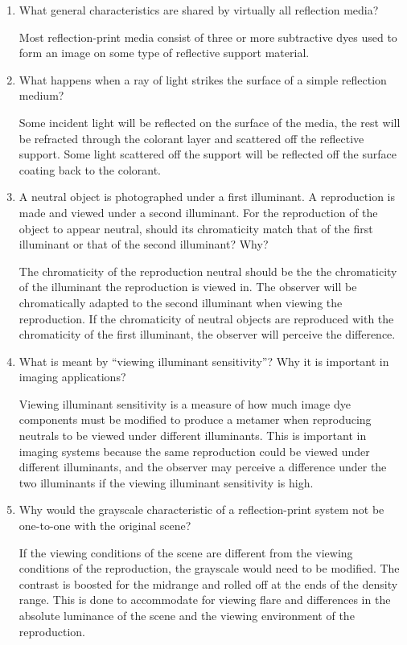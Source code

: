 \begin{enumerate}
\item  What general characteristics are shared by virtually all
reflection media?
\newline
\par  Most reflection-print media consist of three or more
subtractive dyes used to form an image on some type of reflective
support material.
\newline
\item  What happens when a ray of light strikes the surface of a
simple reflection medium?
\newline
\par Some incident light will be reflected on the surface of the media,
the rest will be refracted through the colorant layer and
scattered off the reflective support. Some light scattered off the
support will be reflected off the surface coating back to the
colorant.
\newline

 \item  A neutral object is
photographed under a first illuminant. A reproduction is made and
viewed under a second illuminant. For the reproduction of the
object to appear neutral, should its chromaticity match that of
the first illuminant or that of the second illuminant? Why?
\newline
\par
The chromaticity of the reproduction neutral should be the the
chromaticity of the illuminant the reproduction is viewed in.  The
observer will be chromatically adapted to the second illuminant
when viewing the reproduction.  If the chromaticity of neutral
objects are reproduced with the chromaticity of the first
illuminant, the observer will perceive the difference.
\newline

\item  What is meant by “viewing illuminant sensitivity”? Why it
is important in imaging applications?
\newline
\par Viewing illuminant sensitivity is a measure of how much image dye components must be modified to produce a
metamer when reproducing neutrals to be viewed under different
illuminants.   This is important in imaging systems because the
same reproduction could be viewed under different illuminants, and
the observer may perceive a difference under the two illuminants
if the viewing illuminant sensitivity is high.
\newline

\item Why would the grayscale characteristic of a reflection-print
system not be one-to-one with the original scene?
\newline
\par If the viewing conditions of the scene are different from the viewing
conditions of the reproduction, the grayscale would need to be
modified.  The contrast is boosted for the midrange and rolled off
at the ends of the density range.  This is done to accommodate for
viewing flare and differences in the absolute luminance of the
scene and the viewing environment of the reproduction.


\end{enumerate}
